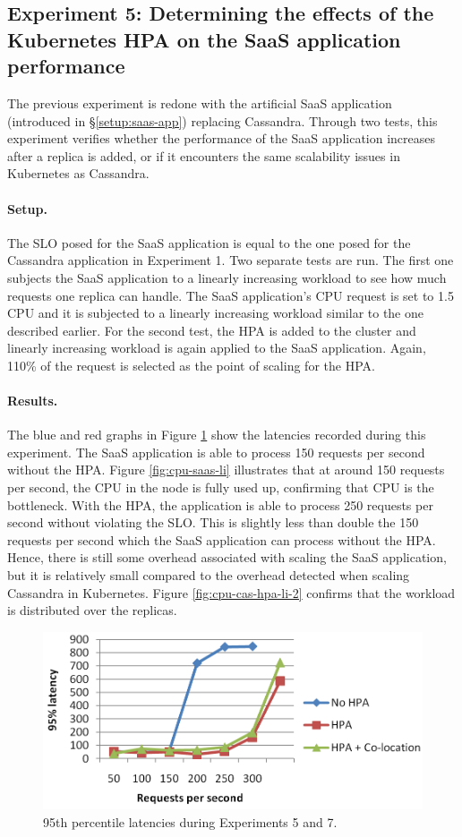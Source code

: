 \subsection{Experiment 5: Determining the effects of the Kubernetes HPA on the SaaS application performance}
The previous experiment is redone with the artificial SaaS application (introduced in \S\ref{setup:saas-app}) replacing Cassandra. Through two tests, this experiment verifies whether the performance of the SaaS application increases after a replica is added, or if it encounters the same scalability issues in Kubernetes as Cassandra.  

\paragraph{Setup.}
The SLO posed for the SaaS application is equal to the one posed for the Cassandra application in Experiment 1. Two separate tests are run. The first one subjects the SaaS application to a linearly increasing workload to see how much requests one replica can handle. The SaaS application's CPU request is set to 1.5 CPU and it is subjected to a linearly increasing workload similar to the one described earlier. For the second test, the HPA is added to the cluster and linearly increasing workload is again applied to the SaaS application. Again, 110\% of the request is selected as the point of scaling for the HPA. 


\paragraph{Results.}
The blue and red graphs in Figure \ref{fig:lat-saas-li} show the latencies recorded during this experiment. The SaaS application is able to process 150 requests per second without the HPA. Figure \ref{fig:cpu-saas-li} illustrates that at around 150 requests per second, the CPU in the node is fully used up, confirming that CPU is the bottleneck. With the HPA, the application is able to process 250 requests per second without violating the SLO. This is slightly less than double the 150 requests per second which the SaaS application can process without the HPA. Hence, there is still some overhead associated with scaling the SaaS application, but it is relatively small compared to the overhead detected when scaling Cassandra in Kubernetes. Figure \ref{fig:cpu-cas-hpa-li-2} confirms that the workload is distributed over the replicas.

\begin{figure}
\centering
\includegraphics[width=0.75\columnwidth]{Images/Experiments/CPU/Latencies/lat-exp5-7.PNG}
\caption{95th percentile latencies during Experiments 5 and 7.}
\label{fig:lat-saas-li}
\end{figure}

